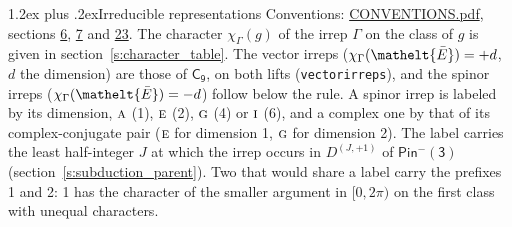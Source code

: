 \documentclass[10pt,a4paper]{article}
\makeatletter
\renewcommand\section{\@startsection{section}{1}{\z@}{-3ex plus -1ex minus -.2ex}%
  {1.2ex plus .2ex}{\normalfont\large\sffamily\bfseries\color{parttitle}}}
\numberwithin{equation}{section}
\newcommand{\eltfont}[1]{{\let\sigma\eltsigma\mathelt{#1}}}
\newcommand{\grp}[1]{\mathsf{#1}}
\newcommand{\irr}[1]{\text{\normalfont\scshape #1}}
\newcommand{\elt}[1]{\eltfont{#1}}
\newcommand{\irrJp}[2]{D^{(#1,#2)}}
\newcommand{\irchar}[1]{\chi_{#1}}
\newcommand{\barred}[1]{\bar{#1}}
\makeatother
\begin{document}
\section{Irreducible representations}\label{s:irreps}
Conventions: \href{../../CONVENTIONS.pdf}{CONVENTIONS.pdf}, sections \href{../../../rotation/CONVENTIONS.pdf\#conv.6}{6}, \href{../../../rotation/CONVENTIONS.pdf\#conv.7}{7} and \href{../../CONVENTIONS.pdf\#conv.23}{23}.
\leavevmode\label{n:function.character}\label{n:irrep.Gamma}The character $\irchar{\Gamma}(g)$ of the irrep $\Gamma$ on the class of $g$ is given in section~\ref{s:character_table}. \label{n:index.dimension}The vector irreps ($\irchar{\Gamma}(\elt{\barred{E}}) = +d$, $d$ the dimension) are those of \href{../../../rotation/data/pdf/C9.pdf}{$\grp{C_{9}}$}, on both lifts (\texttt{vectorirreps}), and the spinor irreps ($\irchar{\Gamma}(\elt{\barred{E}}) = -d$) follow below the rule. A spinor irrep is labeled by its dimension, $\irr{a}$ (1), $\irr{e}$ (2), $\irr{g}$ (4) or $\irr{i}$ (6), and a complex one by that of its complex-conjugate pair ($\irr{e}$ for dimension 1, $\irr{g}$ for dimension 2). The label carries the least half-integer $J$ at which the irrep occurs in $\irrJp{J}{+1}$ of $\grp{Pin^{-}(3)}$ (section~\ref{s:subduction_parent}). Two that would share a label carry the prefixes 1 and 2: 1 has the character of the smaller argument in $[0, 2\pi)$ on the first class with unequal characters.
\end{document}

